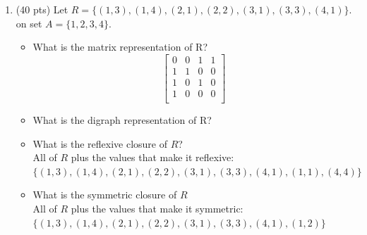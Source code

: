 \documentclass[11pt]{article}
\newcommand\tab[1][1cm]{\hspace*{#1}}
\begin{document}
\begin{enumerate}
  
    \item (40 pts) Let $R = \{(1,3),(1,4),(2,1),(2,2),(3,1),(3,3),(4,1)\}.$ on set $A=\{1,2,3,4\}$. 
\begin{itemize}
  \item What is the matrix representation of R?
    \[\begin{bmatrix}
	0 & 0 & 1 & 1  \\
	1 & 1 & 0 & 0  \\
	1 & 0 & 1 & 0  \\
	1 & 0 & 0 & 0  \\
    \end{bmatrix}\]
  \item What is the digraph representation of R?
  
	
  \item What is the reflexive closure of $R$? \\
  	\tab All of $R$ plus the values that make it reflexive:\\
  	\tab $\{(1,3),(1,4),(2,1),(2,2),(3,1),(3,3),(4,1), (1,1), (4,4) \}$ \\
  \item What is the symmetric closure of $R$ \\
  	\tab All of $R$ plus the values that make it symmetric:\\
  	\tab $\{ (1,3),(1,4),(2,1),(2,2),(3,1),(3,3),(4,1),(1,2) \}$ \\
\end{itemize}

 \end{enumerate}
\end{document}
